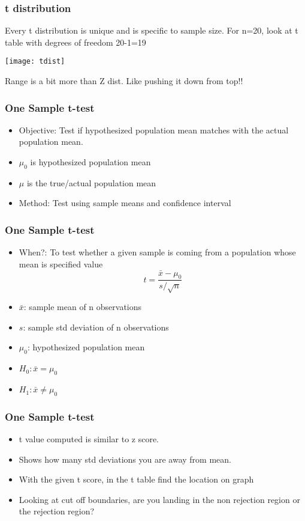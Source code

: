 \begin{frame}
\frametitle{t distribution}
Every t distribution is unique and is specific to sample size. For n=20, look at t table with degrees of freedom 20-1=19
\begin{center}
\texttt{[image: tdist]}
\end{center}
Range is a bit more than Z dist. Like pushing it down from top!!
\end{frame}

\begin{frame}[fragile]\frametitle{One Sample t-test}
\begin{itemize}
\item Objective: Test if hypothesized population mean matches with the actual population mean.
\item $\mu_0$ is hypothesized population mean
\item $\mu$ is the true/actual population mean
\item Method: Test using sample means and confidence interval
\end{itemize}
\end{frame}

\begin{frame}[fragile]\frametitle{One Sample t-test}
\begin{itemize}
\item When?: To test whether a given sample is coming from a population whose mean is specified value
$$
t = \frac{\bar{x} - \mu_0}{s /\sqrt{n}}
$$
\item $\bar{x}$: sample mean of n observations
\item $s$: sample std deviation of n observations
\item $\mu_0$: hypothesized population mean
\item $H_0: \bar{x} = \mu_0$
\item $H_1: \bar{x} \neq \mu_0$
\end{itemize}
\end{frame}

\begin{frame}[fragile]\frametitle{One Sample t-test}
\begin{itemize}
\item t value computed is similar to z score.
\item Shows how many std deviations you are away from mean.
\item With the given t score, in the t table find the location on graph
\item Looking at cut off boundaries, are you landing in the non rejection region or the rejection region?
\end{itemize}
\end{frame}

